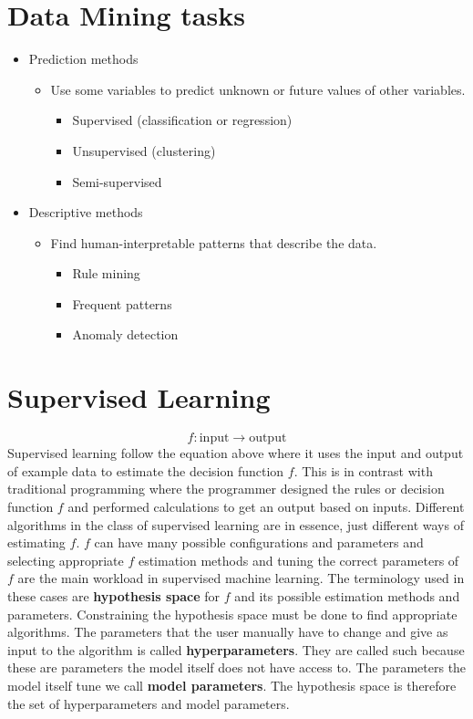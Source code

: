 \section{Data Mining tasks}
\begin{itemize}
    \item Prediction methods
    \begin{itemize}
        \item Use some variables to predict unknown or future values of other variables.
        \begin{itemize}
            \item Supervised (classification or regression)
            \item Unsupervised (clustering)
            \item Semi-supervised
        \end{itemize}
    \end{itemize}
    \item Descriptive methods
    \begin{itemize}
        \item Find human-interpretable patterns that describe the data.
        \begin{itemize}
            \item Rule mining
            \item Frequent patterns
            \item Anomaly detection
        \end{itemize}
    \end{itemize}
\end{itemize}
\section{Supervised Learning}
\begin{equation*}
    f: \text{input} \rightarrow \text{output}
\end{equation*}
Supervised learning follow the equation above where it uses the input and
output of example data to estimate the decision function $f$. This is in contrast
with traditional programming where the programmer designed the rules or decision
function $f$ and performed calculations to get an output based on inputs.
Different algorithms in the class of supervised learning are in essence, just 
different ways of estimating $f$. $f$ can have many possible configurations and
parameters and selecting appropriate $f$ estimation methods and tuning the 
correct parameters of $f$ are the main workload in supervised machine learning.
The terminology used in these cases are \textbf{hypothesis space} for $f$ and 
its possible estimation methods and parameters. Constraining the hypothesis 
space must be done to find appropriate algorithms. The parameters that the 
user manually have to change and give as input to the algorithm is called
\textbf{hyperparameters}. They are called such because these are parameters
the model itself does not have access to. The parameters the model itself tune 
we call \textbf{model parameters}. The hypothesis space is therefore the set of
hyperparameters and model parameters. 


